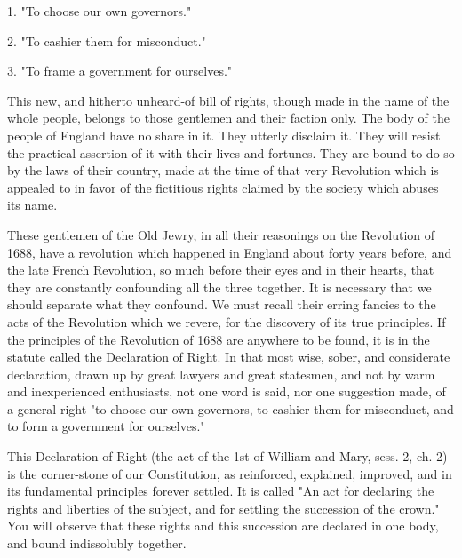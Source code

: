 1. "To choose our own governors."

2. "To cashier them for misconduct."

3. "To frame a government for ourselves."

This new, and hitherto unheard-of bill of rights, though made in the name of the whole people, belongs to those gentlemen and their faction only. The body of the people of England have no share in it. They utterly disclaim it. They will resist the practical assertion of it with their lives and fortunes. They are bound to do so by the laws of their country, made at the time of that very Revolution which is appealed to in favor of the fictitious rights claimed by the society which abuses its name.

These gentlemen of the Old Jewry, in all their reasonings on the Revolution of 1688, have a revolution which happened in England about forty years before, and the late French Revolution, so much before their eyes and in their hearts, that they are constantly confounding all the three together. It is necessary that we should separate what they confound. We must recall their erring fancies to the acts of the Revolution which we revere, for the discovery of its true principles. If the principles of the Revolution of 1688 are anywhere to be found, it is in the statute called the Declaration of Right. In that most wise, sober, and considerate declaration, drawn up by great lawyers and great statesmen, and not by warm and inexperienced enthusiasts, not one word is said, nor one suggestion made, of a general right "to choose our own governors, to cashier them for misconduct, and to form a government for ourselves."

This Declaration of Right (the act of the 1st of William and Mary, sess. 2, ch. 2) is the corner-stone of our Constitution, as reinforced, explained, improved, and in its fundamental principles forever settled. It is called "An act for declaring the rights and liberties of the subject, and for settling the succession of the crown." You will observe that these rights and this succession are declared in one body, and bound indissolubly together.

